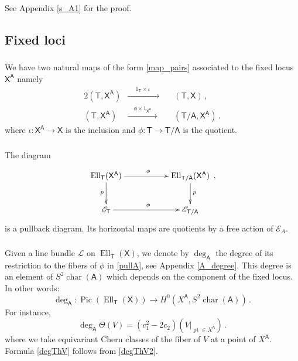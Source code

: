 \documentclass[14pt]{extarticle}
\newcommand{\bT}{\mathsf{T}}
\newcommand{\bA}{\mathsf{A}}
\newcommand{\bX}{\mathsf{X}}
\newcommand{\cL}{\mathscr{L}}
\newcommand{\cE}{\mathscr{E}}
\DeclareMathOperator{\Ell}{Ell}
\DeclareMathOperator{\pt}{pt}
\DeclareMathOperator{\cha}{char}
\DeclareMathOperator{\Pic}{Pic}
\theoremstyle{definition}
\begin{document}
\noindent See Appendix \ref{s_A1} for the proof.

\subsection{Fixed loci}

\subsubsection{}
We have two natural maps of the form  \eqref{map_pairs} associated to the
fixed locus $\bX^\bA$ namely
%
\begin{alignat}{2} 
  \label{incl}
  (\bT, \bX^\bA) & \xrightarrow{\quad\,\, 1_\bT \times \iota\quad\,\,\, \,} &&\, (\bT, \bX) \,, \\
                 (\bT, \bX^\bA) & \xrightarrow{\quad\phi\times 1_{\bX^\bA}\quad} &&\,(\bT/\bA, \bX^\bA) \,.
\end{alignat}
%
where $\iota: \bX^\bA \to \bX$ is the inclusion and $\phi: \bT\to \bT/\bA$ is the
quotient.

\subsubsection{}

The diagram 
%
\begin{equation}
  \label{pullA}
  \xymatrix{
    \Ell_\bT(\bX^\bA) \ar[rr]^{\phi} \ar[d]_p && \Ell_{\bT/\bA}(\bX^\bA) \ar[d]^p \\
    \cE_\bT \ar[rr]^{\phi} && \cE_{\bT/\bA}
    }\,, 
  \end{equation}
  is a pullback diagram. Its  horizontal maps are quotients by a 
  free action of $\cE_A$.

  

  \subsubsection{}

Given a line bundle $\cL$ on $\Ell_\bT(\bX)$, we denote by $\deg_\bA$
the degree of its restriction to the fibers of $\phi$ in
\eqref{pullA}, see Appendix \ref{A_degree}. This degree is an element of $S^2
\cha(\bA)$ which depends on the component of the fixed locus. In other
words:
%
\begin{equation}
  \label{degbA}
  \deg_\bA : \Pic(\Ell_\bT(\bX)) \to H^0(X^\bA, S^2
\cha(\bA)) \,. 
\end{equation}
%
For instance, 
%
\begin{equation}
\deg_\bA \Theta(V) =( c_1^2 - 2 c_2) \left(V|_{\pt \in X^\bA}\right)
\,. \label{degThV}
\end{equation}
%
where we take equivariant Chern classes of the fiber of $V$ at a point of
$X^\bA$. Formula \eqref{degThV} follows from \eqref{degThV2}. 
\end{document}
